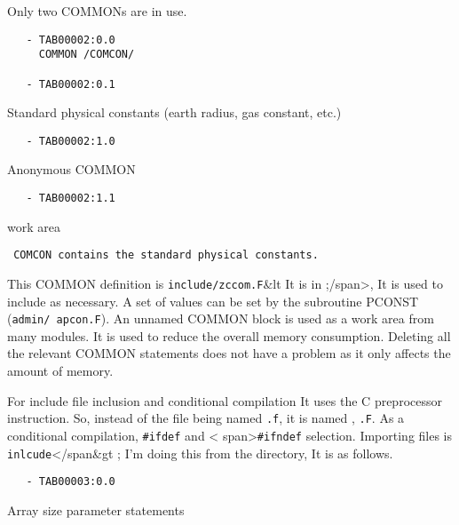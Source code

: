 Only two COMMONs are in use.

\begin{verbatim}
   - TAB00002:0.0 
     COMMON /COMCON/
 
   - TAB00002:0.1 
\end{verbatim}

Standard physical constants (earth radius, gas constant, etc.)

\begin{verbatim}
   - TAB00002:1.0 
\end{verbatim}

Anonymous COMMON

\begin{verbatim}
   - TAB00002:1.1 
\end{verbatim}

work area

\begin{verbatim}
 COMCON contains the standard physical constants.
\end{verbatim}

This COMMON definition is \texttt{include/zccom.F}\&lt It is in
;/span\textgreater, It is used to include as necessary. A set of values
can be set by the subroutine PCONST ({\texttt{admin/\ apcon.F}}). An
unnamed COMMON block is used as a work area from many modules. It is
used to reduce the overall memory consumption. Deleting all the relevant
COMMON statements does not have a problem as it only affects the amount
of memory.

For include file inclusion and conditional compilation It uses the C
preprocessor instruction. So, instead of the file being named
{\texttt{.f}}, it is named , {\texttt{.F}}. As a conditional
compilation, {\texttt{\#ifdef}} and \textless{}
span\textgreater{}\texttt{\#ifndef} selection. Importing files is
\texttt{inlcude}\textless/span\&gt ; I'm doing this from the directory,
It is as follows.

\begin{verbatim}
   - TAB00003:0.0 
\end{verbatim}

Array size parameter statements

